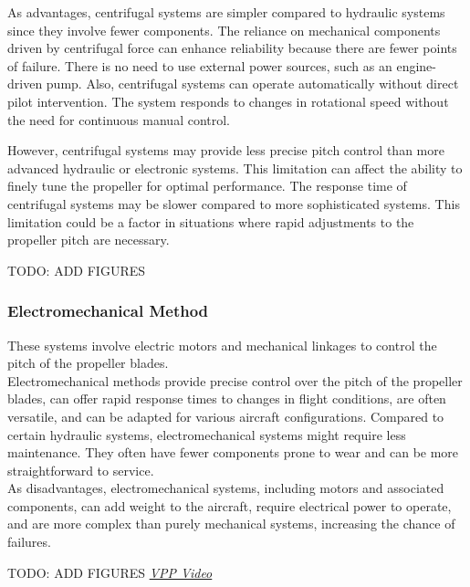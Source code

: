 As advantages, centrifugal systems are simpler compared to hydraulic systems since they involve fewer components.
The reliance on mechanical components driven by centrifugal force can enhance reliability because there are fewer points of failure.
There is no need to use external power sources, such as an engine-driven pump.
Also, centrifugal systems can operate automatically without direct pilot intervention.
The system responds to changes in rotational speed without the need for continuous manual control.

However, centrifugal systems may provide less precise pitch control than more advanced hydraulic or electronic systems. This limitation can affect the ability to finely tune the propeller for optimal performance.
The response time of centrifugal systems may be slower compared to more sophisticated systems. This limitation could be a factor in situations where rapid adjustments to the propeller pitch are necessary.\cite{VPP2}

TODO: ADD FIGURES

\subsubsection{Electromechanical Method}
These systems involve electric motors and mechanical linkages to control the pitch of the propeller blades.\\

Electromechanical methods provide precise control over the pitch of the propeller blades, can offer rapid response times to changes in flight conditions, are often versatile, and can be adapted for various aircraft configurations.
Compared to certain hydraulic systems, electromechanical systems might require less maintenance.
They often have fewer components prone to wear and can be more straightforward to service.\\

As disadvantages, electromechanical systems, including motors and associated components, can add weight to the aircraft, require electrical power to operate, and are more complex than purely mechanical systems, increasing the chance of failures.\cite{VPP2}

TODO: ADD FIGURES
\href{https://www.youtube.com/watch?v=MpsBOQOUB-4}{\textit{VPP Video}}

